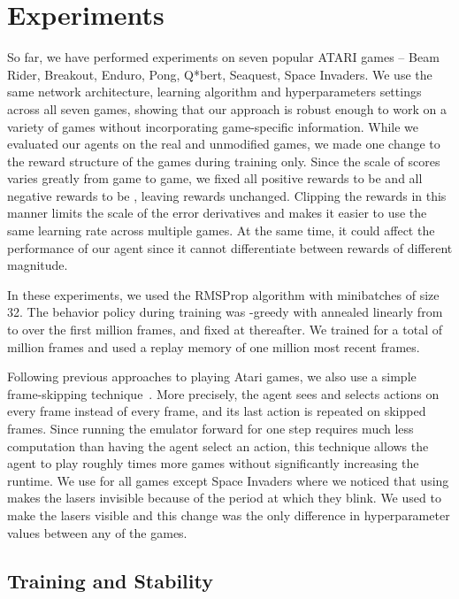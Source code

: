 \documentclass{article} \usepackage{nips13submit_e,times}
\begin{document}
\section{Experiments}
\label{sec:experiments}


So far, we have performed experiments on seven popular ATARI games -- Beam Rider, Breakout, Enduro, Pong, Q*bert, Seaquest, Space Invaders. We use the same network architecture, learning algorithm and hyperparameters settings across all seven games, showing that our approach is robust enough to work on a variety of games without incorporating game-specific information. While we evaluated our agents on the real and unmodified games, we made one change to the reward structure of the games during training only.  Since the scale of scores varies greatly from game to game, we fixed all positive rewards to be  and all negative rewards to be , leaving  rewards unchanged.  Clipping the rewards in this manner limits the scale of the error derivatives and makes it easier to use the same learning rate across multiple games.  At the same time, it could affect the performance of our agent since it cannot differentiate between rewards of different magnitude.

In these experiments, we used the RMSProp algorithm with minibatches of size 32.  The behavior policy during training was -greedy with  annealed linearly from  to  over the first million frames, and fixed at  thereafter.  We trained for a total of  million frames and used a replay memory of one million most recent frames.

Following previous approaches to playing Atari games, we also use a simple frame-skipping technique~\cite{bellemare-ale}. More precisely, the agent sees and selects actions on every  frame instead of every frame, and its last action is repeated on skipped frames.  Since running the emulator forward for one step requires much less computation than having the agent select an action, this technique allows the agent to play roughly  times more games without significantly increasing the runtime.  We use  for all games except Space Invaders where we noticed that using  makes the lasers invisible because of the period at which they blink.  We used  to make the lasers visible and this change was the only difference in hyperparameter values between any of the games.

\subsection{Training and Stability}
\end{document}
